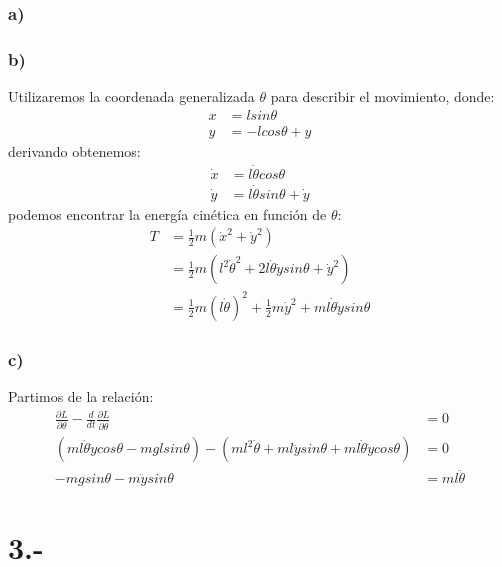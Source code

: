 \documentclass{article}
\begin{document}
\begin{tcolorbox}[breakable]
    \subsubsection*{a)}
    \subsubsection*{b)}
    Utilizaremos la coordenada generalizada $\theta$ para describir el movimiento, donde:
    \begin{align*}
        x &= lsin\theta \\ 
        y &= -lcos\theta + y
    \end{align*}
    derivando obtenemos:
    \begin{align*}
        \dot{x} &= l\dot{\theta}cos\theta \\
        \dot{y} &= l\dot{\theta}sin\theta + \dot{y}
    \end{align*}
    podemos encontrar la energía cinética en función de $\theta$:
    \begin{align*}
        T 
        &= \frac{1}{2}m(\dot{x}^2+\dot{y}^2) \\
        &= \frac{1}{2}m(l^2\dot{\theta}^2 + 2l\dot{\theta}\dot{y}sin\theta + \dot{y}^2) \\
        &=  \frac{1}{2}m(l\dot{\theta})^2 + \frac{1}{2}m\dot{y}^2 + ml\dot{\theta}\dot{y}sin\theta
    \end{align*}
    \subsubsection*{c)}
    Partimos de la relación:
    \begin{align*}
        \frac{\partial L}{\partial \theta} - \frac{d}{dt}\frac{\partial L }{\partial \dot{\theta}} &= 0 \\
        (ml\dot{\theta}\dot{y}cos\theta - mglsin\theta) -(ml^2\dot{\theta} + ml\ddot{y}sin\theta + ml\dot{\theta}\dot{y}cos\theta)  &= 0 \\
        -mgsin\theta - m\ddot{y}sin\theta &= ml\ddot{\theta}
    \end{align*}
\end{tcolorbox}

\section*{3.-}
\end{document}
